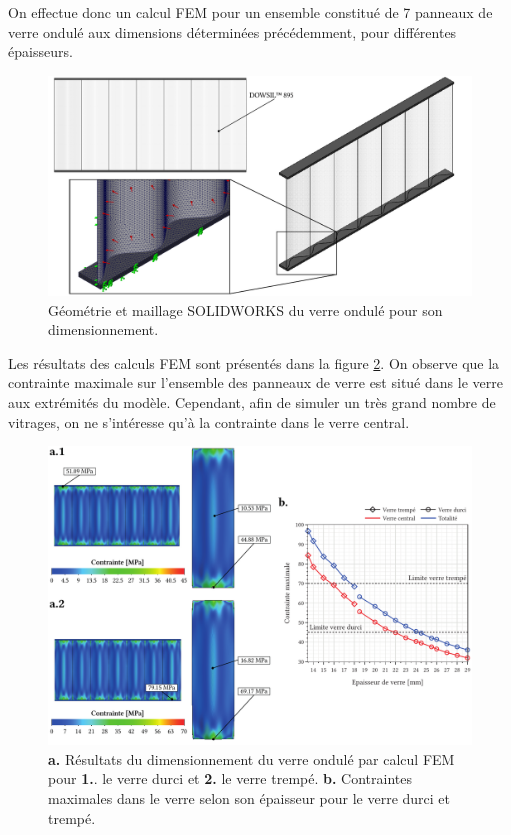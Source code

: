 \documentclass[11pt,titlepage]{article}
\begin{document}
On effectue donc un calcul \acrshort{FEM} pour un ensemble constitué de 7 panneaux de verre ondulé aux dimensions déterminées précédemment, pour différentes épaisseurs.
\begin{figure}[H]
    \centering
    \includegraphics[width=\linewidth]{img/ondul/fem/dim_fem.pdf}
    \caption{Géométrie et maillage SOLIDWORKS du verre ondulé pour son dimensionnement.}
    \label{fig:dim_onful_model}
\end{figure}

Les résultats des calculs \acrshort{FEM} sont présentés dans la figure \ref{fig:dim_onful_float}. On observe que la contrainte maximale sur l'ensemble des panneaux de verre est situé dans le verre aux extrémités du modèle. Cependant, afin de simuler un très grand nombre de vitrages, on ne s'intéresse qu'à la contrainte dans le verre central.

\begin{figure}[H]
    \centering
    \includegraphics[width=\linewidth]{img/ondul/fem/dim_float.pdf}
    \caption{\textbf{a.} Résultats du dimensionnement du verre ondulé par calcul \acrshort{FEM} pour \textbf{1.}. le verre durci et \textbf{2.} le verre trempé. \textbf{b.} Contraintes maximales dans le verre selon son épaisseur pour le verre durci et trempé.}
    \label{fig:dim_onful_float}
\end{figure}
\end{document}
